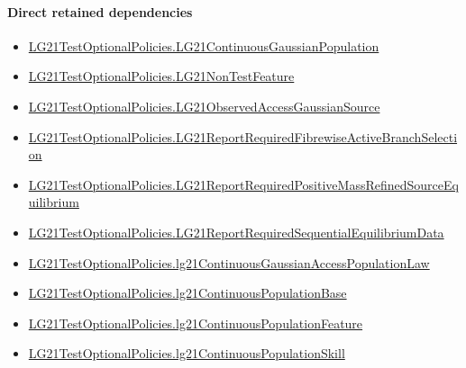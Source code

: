 \documentclass[10pt]{article}
\begin{document}
\paragraph{Direct retained dependencies}
\begin{itemize}\raggedright
\item \hyperlink{paper-prerequisite-f5e1c886d250142b}{LG21\allowbreak{}Test\allowbreak{}Optional\allowbreak{}Policies.\allowbreak{}LG21\allowbreak{}Continuous\allowbreak{}Gaussian\allowbreak{}Population}
\item \hyperlink{governing-declaration-81cb73bf3869c56d}{LG21\allowbreak{}Test\allowbreak{}Optional\allowbreak{}Policies.\allowbreak{}LG21\allowbreak{}Non\allowbreak{}Test\allowbreak{}Feature}
\item \hyperlink{governing-declaration-2b8ecce015c6e865}{LG21\allowbreak{}Test\allowbreak{}Optional\allowbreak{}Policies.\allowbreak{}LG21\allowbreak{}Observed\allowbreak{}Access\allowbreak{}Gaussian\allowbreak{}Source}
\item \hyperlink{governing-declaration-26b5bf4a8106606e}{LG21\allowbreak{}Test\allowbreak{}Optional\allowbreak{}Policies.\allowbreak{}LG21\allowbreak{}Report\allowbreak{}Required\allowbreak{}Fibrewise\allowbreak{}Active\allowbreak{}Branch\allowbreak{}Selection}
\item \hyperlink{governing-declaration-f947776cd95aec9b}{LG21\allowbreak{}Test\allowbreak{}Optional\allowbreak{}Policies.\allowbreak{}LG21\allowbreak{}Report\allowbreak{}Required\allowbreak{}Positive\allowbreak{}Mass\allowbreak{}Refined\allowbreak{}Source\allowbreak{}Equilibrium}
\item \hyperlink{governing-declaration-b4426f8407925151}{LG21\allowbreak{}Test\allowbreak{}Optional\allowbreak{}Policies.\allowbreak{}LG21\allowbreak{}Report\allowbreak{}Required\allowbreak{}Sequential\allowbreak{}Equilibrium\allowbreak{}Data}
\item \hyperlink{governing-declaration-fa49b6c4b938413f}{LG21\allowbreak{}Test\allowbreak{}Optional\allowbreak{}Policies.\allowbreak{}lg21\allowbreak{}Continuous\allowbreak{}Gaussian\allowbreak{}Access\allowbreak{}Population\allowbreak{}Law}
\item \hyperlink{governing-declaration-3b5146b167dee236}{LG21\allowbreak{}Test\allowbreak{}Optional\allowbreak{}Policies.\allowbreak{}lg21\allowbreak{}Continuous\allowbreak{}Population\allowbreak{}Base}
\item \hyperlink{governing-declaration-f07391974a356bb7}{LG21\allowbreak{}Test\allowbreak{}Optional\allowbreak{}Policies.\allowbreak{}lg21\allowbreak{}Continuous\allowbreak{}Population\allowbreak{}Feature}
\item \hyperlink{governing-declaration-339ce55dcb78dfb9}{LG21\allowbreak{}Test\allowbreak{}Optional\allowbreak{}Policies.\allowbreak{}lg21\allowbreak{}Continuous\allowbreak{}Population\allowbreak{}Skill}
\end{itemize}
\hypertarget{governing-declaration-9b4e91413e72c7c3}{}
\end{document}

